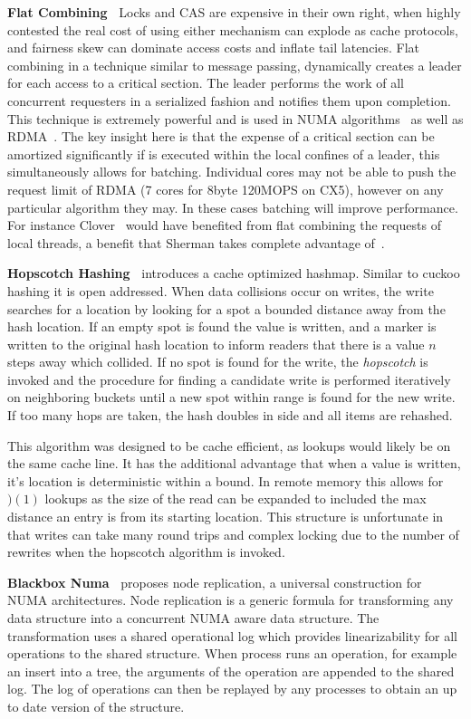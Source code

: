 \textbf{Flat Combining~\cite{flat-combine}} Locks and CAS are expensive in their
own right, when highly contested the real cost of using either mechanism can
explode as cache protocols, and fairness skew can dominate access costs and
inflate tail latencies. Flat combining in a technique similar to message
passing, dynamically creates a leader for each access to a critical section. The
leader performs the work of all concurrent requesters in a serialized fashion
and notifies them upon completion. This technique is extremely powerful and is
used in NUMA algorithms~\cite{black-box-numa} as well as RDMA~\cite{flock}. The
key insight here is that the expense of a critical section can be amortized
significantly if is executed within the local confines of a leader, this
simultaneously allows for batching. Individual cores may not be able to push the
request limit of RDMA (7 cores for 8byte 120MOPS on CX5), however on any
particular algorithm they may. In these cases batching will improve performance.
For instance Clover~\cite{clover} would have benefited from flat combining the
requests of local threads, a benefit that Sherman takes complete advantage
of~\cite{sherman}.


\textbf{Hopscotch Hashing~\cite{hopscotch}} introduces a cache optimized
hashmap. Similar to cuckoo hashing it is open addressed. When data collisions
occur on writes, the write searches for a location by looking for a spot a
bounded distance away from the hash location. If an empty spot is found the
value is written, and a marker is written to the original hash location to
inform readers that there is a value $n$ steps away which collided. If no spot
is found for the write, the \textit{hopscotch} is invoked and the procedure for
finding a candidate write is performed iteratively on neighboring buckets
until a new spot within range is found for the new write. If too many hops are
taken, the hash doubles in side and all items are rehashed.

This algorithm was designed to be cache efficient, as lookups would likely be on
the same cache line. It has the additional advantage that when a value is
written, it's location is deterministic within a bound. In remote memory this
allows for $)(1)$ lookups as the size of the read can be expanded to included
the max distance an entry is from its starting location. This structure is
unfortunate in that writes can take many round trips and complex locking due to
the number of rewrites when the hopscotch algorithm is invoked.


\textbf{Blackbox Numa~\cite{black-box-numa}} proposes node replication, a
universal construction for NUMA architectures. Node replication is a generic
formula for transforming any data structure into a concurrent NUMA aware data
structure. The transformation uses a shared operational log which provides
linearizability for all operations to the shared structure. When process runs an
operation, for example an insert into a tree, the arguments of the operation are
appended to the shared log. The log of operations can then be replayed by any
processes to obtain an up to date version of the structure.

